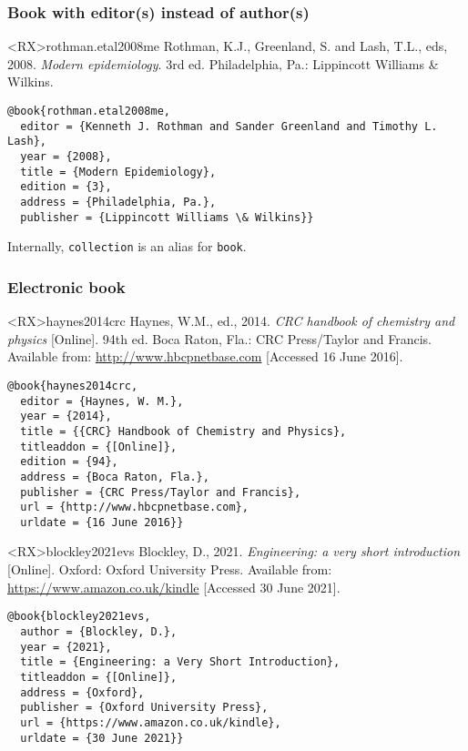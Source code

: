 \documentclass[10pt,a4paper]{article}
\newenvironment{info}{%
  \begin{list}{\makebox[2em][c]{\faInfoCircle}}{%
    \setlength{\leftmargin}{2em}
    \setlength{\labelwidth}{2em}
    \setlength{\labelsep}{0pt}}
}{\end{list}}
\begin{document}
\subsubsection*{Book with editor(s) instead of author(s)}

\begin{bibexbox}<RX>{rothman.etal2008me}
  Rothman, K.J., Greenland, S. and Lash, T.L., eds, 2008. \emph{Modern epidemiology}. 3rd ed. Philadelphia, Pa.: Lippincott Williams \& Wilkins.
  \tcblower
\begin{Verbatim}
@book{rothman.etal2008me,
  editor = {Kenneth J. Rothman and Sander Greenland and Timothy L. Lash},
  year = {2008},
  title = {Modern Epidemiology},
  edition = {3},
  address = {Philadelphia, Pa.},
  publisher = {Lippincott Williams \& Wilkins}}
\end{Verbatim}
\end{bibexbox}

\begin{info}\item
Internally, \texttt{collection} is an alias for \texttt{book}.
\end{info}

\subsubsection*{Electronic book}

\begin{bibexbox}<RX>{haynes2014crc}
  Haynes, W.M., ed.\@, 2014. \emph{CRC handbook of chemistry and physics} [Online]. 94th ed. Boca Raton, Fla.: CRC Press/Taylor and Francis. Available from: \url{http://www.hbcpnetbase.com} [Accessed 16 June 2016].
  \tcblower
\begin{Verbatim}
@book{haynes2014crc,
  editor = {Haynes, W. M.},
  year = {2014},
  title = {{CRC} Handbook of Chemistry and Physics},
  titleaddon = {[Online]},
  edition = {94},
  address = {Boca Raton, Fla.},
  publisher = {CRC Press/Taylor and Francis},
  url = {http://www.hbcpnetbase.com},
  urldate = {16 June 2016}}
\end{Verbatim}
\end{bibexbox}

\begin{bibexbox}<RX>{blockley2021evs}
  Blockley, D., 2021. \emph{Engineering: a very short introduction} [Online]. Oxford: Oxford University Press. Available from: \url{https://www.amazon.co.uk/kindle} [Accessed 30 June 2021].
  \tcblower
\begin{Verbatim}
@book{blockley2021evs,
  author = {Blockley, D.},
  year = {2021},
  title = {Engineering: a Very Short Introduction},
  titleaddon = {[Online]},
  address = {Oxford},
  publisher = {Oxford University Press},
  url = {https://www.amazon.co.uk/kindle},
  urldate = {30 June 2021}}
\end{Verbatim}
\end{bibexbox}
\end{document}
